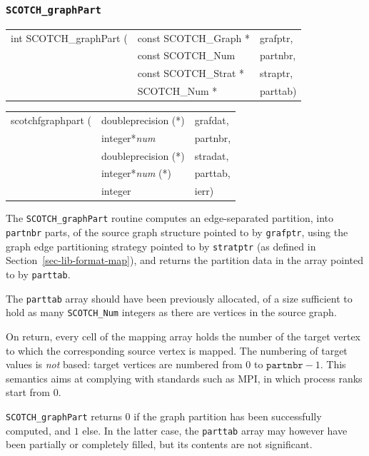 \subsubsection{{\tt SCOTCH\_graphPart}}

\begin{itemize}
\progsyn

{\tt\begin{tabular}{l@{}ll}
int SCOTCH\_graphPart ( & const SCOTCH\_Graph * & grafptr, \\
                        & const SCOTCH\_Num     & partnbr, \\
                        & const SCOTCH\_Strat * & straptr, \\
                        & SCOTCH\_Num *         & parttab)
\end{tabular}}

{\tt\begin{tabular}{l@{}ll}
scotchfgraphpart ( & doubleprecision (*)   & grafdat, \\
                   & integer*{\it num}     & partnbr, \\
                   & doubleprecision (*)   & stradat, \\
                   & integer*{\it num} (*) & parttab, \\
                   & integer               & ierr)
\end{tabular}}

\progdes

The {\tt SCOTCH\_graphPart} routine computes an edge-separated
partition, into {\tt partnbr} parts, of the source graph structure
pointed to by {\tt grafptr}, using the graph edge partitioning
strategy pointed to by {\tt stratptr} (as defined in
Section~\ref{sec-lib-format-map}), and returns the partition data in
the array pointed to by {\tt parttab}.

The {\tt parttab} array should have been previously allocated, of a
size sufficient to hold as many {\tt SCOTCH\_\lbt Num} integers as
there are vertices in the source graph.

On return, every cell of the mapping array holds the number of the
target vertex to which the corresponding source vertex is mapped. The
numbering of target values is {\em not\/} based: target vertices are
numbered from $0$ to $\mathtt{partnbr} - 1$. This semantics aims at
complying with standards such as MPI, in which process ranks start
from $0$.

\progret

{\tt SCOTCH\_graphPart} returns $0$ if the graph partition has
been successfully computed, and $1$ else. In the latter case, the
{\tt parttab} array may however have been partially or completely
filled, but its contents are not significant.
\end{itemize}

